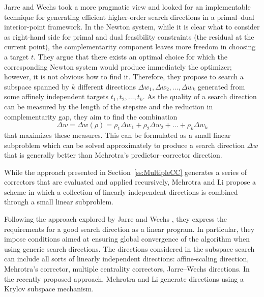 Jarre and Wechs \cite{JarreWechs} took a more pragmatic view and
looked for an implementable technique for generating efficient 
higher-order search directions in a primal--dual interior-point framework.
In the Newton system, while it is clear what to consider as right-hand 
side for primal and dual feasibility constraints (the residual 
at the current point), the complementarity component leaves more 
freedom in choosing a target $t$. They argue that there exists 
an optimal choice for which the corresponding Newton system would 
produce immediately the optimizer; however, it is not obvious how 
to find it.
Therefore, they propose to search a subspace spanned by $k$ different 
directions $\Delta w_1, \Delta w_2, \ldots, \Delta w_k$ generated 
from some affinely independent targets $t_1,t_2,\ldots,t_k$.
As the quality of a search direction can be measured by the length 
of the stepsize and the reduction in complementarity gap, they aim 
to find the combination 
\[
\Delta w = \Delta w(\rho) 
         = \rho_1\Delta w_1 + \rho_2\Delta w_2 + \ldots + \rho_k\Delta w_k
\]
that maximizes these measures.
This can be formulated as a small linear subproblem which can 
be solved approximately to produce a search direction $\Delta w$ 
that is generally better than Mehrotra's predictor--corrector direction.
%



While the approach presented in Section~\ref{ss:MultipleCC} 
generates a series of correctors 
that are evaluated and applied recursively, Mehrotra and Li 
\cite{MehrotraLi} propose a scheme in which a collection of linearly 
independent directions is combined through a small linear subproblem.

Following the approach explored by Jarre and Wechs \cite{JarreWechs}, 
they express the requirements for a good search direction as a linear 
program. In particular, they impose conditions aimed at ensuring 
global convergence of the algorithm when using generic search directions.
The directions considered in the subspace search can include all 
sorts of linearly independent directions: affine-scaling direction, 
Mehrotra's corrector, multiple centrality correctors, Jarre--Wechs 
directions. 
In the recently proposed approach, Mehrotra and Li \cite{MehrotraLi}
generate directions using a Krylov subspace mechanism.

